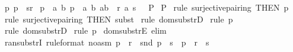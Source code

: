 \begin{isabellebody}
\ p{}{\isacharcolon}\ {\isachardoublequoteopen}p\ {\isacharcolon}\ {\isacharparenleft}s{\isacharless}{\isacharminus}{\isacharcolon}r{\isacharparenright}{\isachardoublequoteclose}\isanewline
{}\ p{}{\isacharcolon}\ {\isachardoublequoteopen}{\isacharbang}{\isacharbang}\ a\ b{\isachardot}{\isacharbrackleft}{\isacharbar}\ p\ {\isacharequal}\ {\isacharparenleft}a{\isacharcomma}\ b{\isacharparenright}{\isacharsemicolon}\ {\isacharparenleft}a{\isacharcomma}b{\isacharparenright}\ {\isacharcolon}\ r{\isacharsemicolon}\ a\ {\isachartilde}{\isacharcolon}s\ {\isacharbar}{\isacharbrackright}\ {\isacharequal}{\isacharequal}{\isachargreater}\ P{\isachardoublequoteclose}\isanewline
{}\ {\isachardoublequoteopen}P{\isachardoublequoteclose}\isanewline
%
\isadelimproof
%
\endisadelimproof
%
\isatagproof
{}\isamarkupfalse%
\ {\isacharparenleft}rule\ surjective{\isacharunderscore}pairing\ {\isacharbrackleft}THEN\ p{}{\isacharbrackright}{\isacharparenright}\isanewline
{}\isamarkupfalse%
\ {\isacharparenleft}rule\ surjective{\isacharunderscore}pairing\ {\isacharbrackleft}THEN\ subst{\isacharbrackright}{\isacharparenright}\isanewline
{}\isamarkupfalse%
\ {\isacharparenleft}rule\ dom{\isacharunderscore}substrD{}{\isacharparenright}\isanewline
{}\isamarkupfalse%
\ {\isacharparenleft}rule\ p{}{\isacharparenright}\isanewline
{}\isamarkupfalse%
\ {\isacharparenleft}rule\ dom{\isacharunderscore}substrD{}{\isacharparenright}\isanewline
{}\isamarkupfalse%
\ {\isacharparenleft}rule\ p{}{\isacharparenright}\isanewline
{}\isamarkupfalse%
%
\endisatagproof
{\isafoldproof}%
%
\isadelimproof
\isanewline
%
\endisadelimproof
{}\isamarkupfalse%
\ dom{\isacharunderscore}substrE\ {\isacharbrackleft}elim{\isacharbang}{\isacharbrackright}\isanewline
\isanewline
{}\isamarkupfalse%
\ ran{\isacharunderscore}substrI\ {\isacharbrackleft}rule{\isacharunderscore}format\ {\isacharparenleft}no{\isacharunderscore}asm{\isacharparenright}{\isacharbrackright}{\isacharcolon}\ {\isachardoublequoteopen}p\ {\isacharcolon}\ r\ {\isacharminus}{\isacharminus}{\isachargreater}\ snd\ p\ {\isachartilde}{\isacharcolon}\ s\ {\isacharminus}{\isacharminus}{\isachargreater}\ p\ {\isacharcolon}\ {\isacharparenleft}r\ {\isacharcolon}{\isacharminus}{\isachargreater}\ s{\isacharparenright}{\isachardoublequoteclose}\isanewline
%
\isadelimproof
%
\endisadelimproof

\end{isabellebody}
